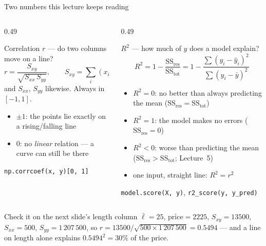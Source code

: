 \documentclass[aspectratio=169]{beamer}
\begin{document}
\begin{frame}[shrink=6]{Two numbers this lecture keeps reading}
  \begin{columns}[T]
    \begin{column}{0.49\textwidth}
      \begin{block}{Correlation $r$ --- do two columns move on a line?}
        \small
        \[
          r = \frac{S_{xy}}{\sqrt{S_{xx}\,S_{yy}}}, \qquad
          S_{xy} = \sum_i (x_i-\bar x)(y_i-\bar y)
        \]
        and $S_{xx}$, $S_{yy}$ likewise. Always in $[-1, 1]$.
        \begin{itemize}
          \item $\pm 1$: the points lie exactly on a rising/falling line
          \item $0$: no \emph{linear} relation --- a curve can still be there
        \end{itemize}
        \texttt{np.corrcoef(x, y)[0, 1]}
      \end{block}
    \end{column}
    \begin{column}{0.49\textwidth}
      \begin{block}{$R^2$ --- how much of $y$ does a model explain?}
        \small
        \[
          R^2 = 1 - \frac{\mathrm{SS}_{\mathrm{res}}}{\mathrm{SS}_{\mathrm{tot}}}
          = 1 - \frac{\sum (y_i-\hat y_i)^2}{\sum (y_i-\bar y)^2}
        \]
        \begin{itemize}
          \item $R^2 = 0$: no better than always predicting the mean
            ($\mathrm{SS}_{\mathrm{res}} = \mathrm{SS}_{\mathrm{tot}}$)
          \item $R^2 = 1$: the model makes no errors
            ($\mathrm{SS}_{\mathrm{res}} = 0$)
          \item $R^2 < 0$: worse than predicting the mean
            ($\mathrm{SS}_{\mathrm{res}} > \mathrm{SS}_{\mathrm{tot}}$; Lecture~5)
          \item one input, straight line: $R^2 = r^2$
        \end{itemize}
        \texttt{model.score(X, y)}, \texttt{r2\_score(y, y\_pred)}
      \end{block}
    \end{column}
  \end{columns}
  \begin{exampleblock}{Check it on the next slide's length column}
    \small $\bar\ell = 25$, $\overline{\text{price}} = 2225$,
    $S_{xy} = 13500$, $S_{xx} = 500$, $S_{yy} = 1\,207\,500$, so
    $r = 13500/\sqrt{500 \times 1\,207\,500} = 0.5494$ --- and a line on
    length alone explains $0.5494^2 = 30\%$ of the price.
  \end{exampleblock}
\end{frame}
\end{document}
